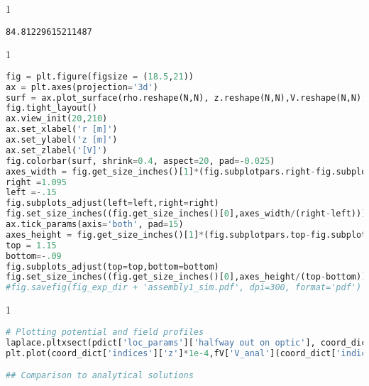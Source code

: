 \begin{spacing}{1} \begin{lstlisting}
84.81229615211487
\end{lstlisting} \end{spacing}

\begin{spacing}{1} \begin{lstlisting}[frame=single, language=Python]
fig = plt.figure(figsize = (18.5,21))
ax = plt.axes(projection='3d') 
surf = ax.plot_surface(rho.reshape(N,N), z.reshape(N,N),V.reshape(N,N),rstride=1,cstride=1,cmap=cm.inferno,alpha=1,linewidth=10,rasterized=True)
fig.tight_layout()
ax.view_init(20,210)
ax.set_xlabel('r [m]')
ax.set_ylabel('z [m]')
ax.set_zlabel('[V]')
fig.colorbar(surf, shrink=0.4, aspect=20, pad=-0.025)
axes_width = fig.get_size_inches()[1]*(fig.subplotpars.right-fig.subplotpars.left)
right =1.095
left =-.15
fig.subplots_adjust(left=left,right=right) 
fig.set_size_inches((fig.get_size_inches()[0],axes_width/(right-left)))
ax.tick_params(axis='both', pad=15)
axes_height = fig.get_size_inches()[1]*(fig.subplotpars.top-fig.subplotpars.bottom)
top = 1.15
bottom=-.09
fig.subplots_adjust(top=top,bottom=bottom)             
fig.set_size_inches((fig.get_size_inches()[0],axes_height/(top-bottom)))
#fig.savefig(fig_exp_dir + 'assembly1_sim.pdf', dpi=300, format='pdf')
\end{lstlisting} \end{spacing}

\begin{spacing}{1} \begin{lstlisting}[frame=single, language=Python]
# Plotting potential and field profiles
laplace.pltxsect(pdict['loc_params']['halfway out on optic'], coord_dict, V)
plt.plot(coord_dict['indices']['z']*1e-4,fV['V_anal'](coord_dict['indices']['z']*1e-4))

## Comparison to analytical solutions
\end{lstlisting} \end{spacing}


